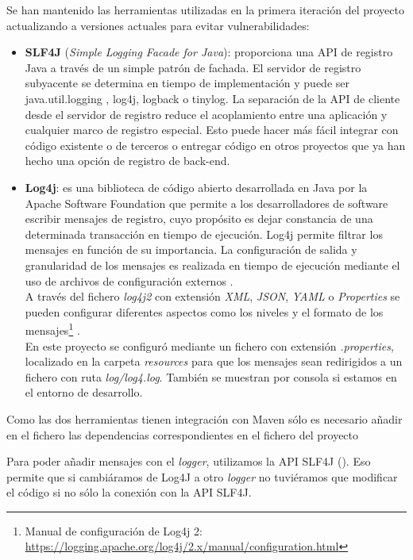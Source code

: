 Se han mantenido las herramientas utilizadas en la primera iteración del proyecto \cite{TFGPrevio} actualizando a versiones actuales para evitar vulnerabilidades:
\begin{itemize}
	\item \textbf{SLF4J} (\textit{Simple Logging Facade for Java}): proporciona una API de registro Java a través de un simple patrón de fachada. El servidor de registro subyacente se determina en tiempo de implementación y puede ser java.util.logging , log4j, logback o tinylog. La separación de la API de cliente desde el servidor de registro reduce el acoplamiento entre una aplicación y cualquier marco de registro especial. Esto puede hacer más fácil integrar con código existente o de terceros o entregar código en otros proyectos que ya han hecho una opción de registro de back-end\cite{SLF4J_wiki}.

	\item\textbf{Log4j}: es una biblioteca de código abierto desarrollada en Java por la Apache Software Foundation que permite a los desarrolladores de software escribir mensajes de registro, cuyo propósito es dejar constancia de una determinada transacción en tiempo de ejecución. Log4j permite filtrar los mensajes en función de su importancia. La configuración de salida y granularidad de los mensajes es realizada en tiempo de ejecución mediante el uso de archivos de configuración externos \cite{Log4j_wiki}. 
	\\A través del fichero \textit{log4j2} con extensión \textit{XML}, \textit{JSON}, \textit{YAML} o \textit{Properties} se pueden configurar diferentes aspectos como los niveles y el formato de los mensajes\footnote{Manual de configuración de Log4j 2: \url{https://logging.apache.org/log4j/2.x/manual/configuration.html}} \cite{apache_apache_nodate}. 
	\\En este proyecto se configuró mediante un fichero con extensión \textit{.properties}, localizado en la carpeta \textit{resources}  para que los mensajes sean redirigidos a un fichero con ruta \textit{log/log4.log}. También se muestran por consola si estamos en el entorno de desarrollo.	
\end{itemize}

Como las dos herramientas tienen integración con Maven sólo es necesario añadir en el fichero  las dependencias correspondientes en el fichero  del proyecto


Para poder añadir mensajes con el \textit{logger}, utilizamos la API SLF4J (). Eso permite que si cambiáramos de Log4J a otro \textit{logger} no tuviéramos que modificar el código si no sólo la conexión con la API SLF4J.

